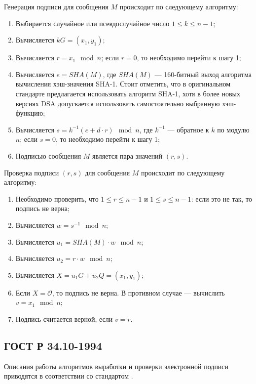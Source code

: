 \documentclass{./civarticle}
\begin{document}
Генерация подписи для сообщения $M$ происходит по следующему алгоритму:

\begin{enumerate}
    \item Выбирается случайное или псевдослучайное число $1 \leq k \leq n - 1$;
    \item Вычисляется $kG = (x_1, y_1)$;
    \item Вычисляется $r = x_1 \mod n$; если $r = 0$, то необходимо перейти к шагу 1;
    \item Вычисляется $e = SHA(M)$, где $SHA(M)$ --- 160-битный выход алгоритма вычисления хэш-значения SHA-1. Стоит отметить, что в оригинальном стандарте предлагается использовать алгоритм SHA-1, хотя в более новых версиях DSA допускается использовать самостоятельно выбранную хэш-функцию;
    \item Вычисляется $s = k^{-1}(e + d\cdot r) \mod n$, где $k^{-1}$ — обратное к $k$ по модулю $n$; если $s = 0$, то необходимо перейти к шагу 1;
    \item Подписью сообщения $M$ является пара значений $(r, s)$.
\end{enumerate}

Проверка подписи $(r, s)$ для сообщения $M$ происходит по следующему алгоритму:

\begin{enumerate}
    \item Необходимо проверить, что $1 \leq r \leq n - 1$ и $1 \leq s \leq n - 1$: если это не так, то подпись не верна;
    \item Вычисляется $w = s^{-1} \mod n$;
    \item Вычисляется $u_1 = SHA(M) \cdot w \mod n$;
    \item Вычисляется $u_2 = r \cdot w \mod n$;
    \item Вычисляется $X = u_1G + u_2Q = (x_1, y_1)$;
    \item Если $X = \mathcal{O}$, то подпись не верна. В противном случае --- вычислить $v = x_1 \mod n$;
    \item Подпись считается верной, если $v = r$.
\end{enumerate}

\subsection{ГОСТ Р 34.10-1994}

Описания работы алгоритмов выработки и проверки электронной подписи приводятся в соответствии со стандартом \cite{gost10-94}.
\end{document}
